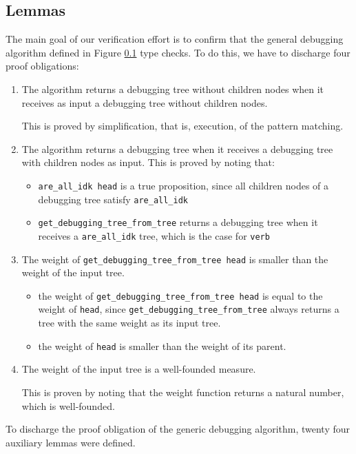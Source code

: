 \subsection{Lemmas}
The main goal of our verification effort is to confirm that the general debugging algorithm defined in Figure \ref{} type checks. To do this, we have to discharge four proof obligations:
\begin{enumerate}
    \item The algorithm returns a debugging tree without children nodes when it receives as input a debugging tree without children nodes.
    
    This is proved by simplification, that is, execution, of the pattern matching.
    \item The algorithm returns a debugging tree when it receives a debugging tree with children nodes as input.
    This is proved by noting that:
    \begin{itemize}
        \item \verb|are_all_idk head| is a true proposition, since all children nodes of a debugging tree satisfy \verb|are_all_idk| 
        \item \verb|get_debugging_tree_from_tree| returns a debugging tree when it receives a \verb|are_all_idk| tree, which is the case for \verb|verb| 
    \end{itemize}
    \item The weight of \verb|get_debugging_tree_from_tree head| is smaller than the weight of the input tree.
    \begin{itemize}
        \item the weight of \verb|get_debugging_tree_from_tree head| is equal to the weight of \verb|head|, since \verb|get_debugging_tree_from_tree| always returns a tree with the same weight as its input tree.  
        \item the weight of \verb|head| is smaller than the weight of its parent.
    \end{itemize}
    \item The weight of the input tree is a well-founded measure.
        
    This is proven by noting that the weight function returns a natural number, which is well-founded.
\end{enumerate}

To discharge the proof obligation of the generic debugging algorithm, twenty four auxiliary lemmas were defined.

